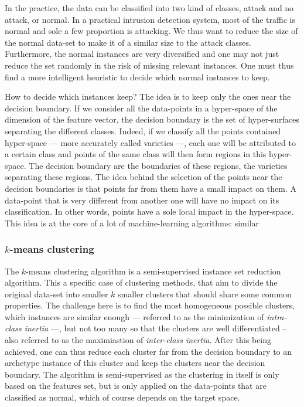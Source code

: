 In the practice, the data can be classified into two kind of classes, attack and no attack, or normal. In a practical intrusion detection system, most of the traffic is normal and sole a few proportion is attacking. We thus want to reduce the size of the normal data-set to make it of a similar size to the attack classes. Furthermore, the normal instances are very diversified and one may not just reduce the set randomly in the risk of missing relevant instances. One must thus find a more intelligent heuristic to decide which normal instances to keep.

How to decide which instances keep? The idea is to keep only the ones near the decision boundary. If we consider all the data-points in a hyper-space of the dimension of the feature vector, the decision boundary is the set of hyper-surfaces separating the different classes. Indeed, if we classify all the points contained hyper-space --- more accurately called varieties ---, each one will be attributed to a certain class and points of the same class will then form regions in this hyper-space. The decision boundary are the boundaries of these regions, the varieties separating these regions. The idea behind the selection of the points near the decision boundaries is that points far from them have a small impact on them. A data-point that is very different from another one will have no impact on its classification. In other words, points have a sole local impact in the hyper-space. This idea is at the core of a lot of machine-learning algorithms: similar 

\subsubsection{$k$-means clustering}
The $k$-means clustering algorithm is a semi-supervised instance set reduction algorithm. This a specific case of clustering methods, that aim to divide the original data-set into smaller $k$ smaller clusters that should share some common properties. The challenge here is to find the most homogeneous possible clusters, which instances are similar enough --- referred to as the minimization of \emph{intra-class inertia} ---, but not too many so that the clusters are well differentiated -- also referred to as the maximiastion of \emph{inter-class inertia}. After this being achieved, one can thus reduce each cluster far from the decision boundary to an archetype instance of this cluster and keep the clusters near the decision boundary. The algorithm is semi-supervised as the clustering in itself is only based on the features set, but is only applied on the data-points that are classified as normal, which of course depends on the target space.

